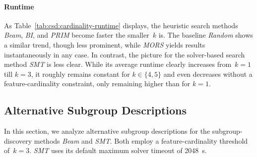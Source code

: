 \documentclass{article}
\theoremstyle{definition}
\begin{document}
\paragraph{Runtime}

As Table~\ref{tab:csd:cardinality-runtime} displays, the heuristic search methods \emph{Beam}, \emph{BI}, and \emph{PRIM} become faster the smaller~$k$ is.
The baseline \emph{Random} shows a similar trend, though less prominent, while \emph{MORS} yields results instantaneously in any case.
In contrast, the picture for the solver-based search method \emph{SMT} is less clear.
While its average runtime clearly increases from~$k=1$ till $k=3$, it roughly remains constant for $k \in \{4, 5\}$ and even decreases without a feature-cardinality constraint, only remaining higher than for $k = 1$.

\subsection{Alternative Subgroup Descriptions}
\label{sec:csd:evaluation:alternatives}

In this section, we analyze alternative subgroup descriptions for the subgroup-discovery methods \emph{Beam} and \emph{SMT}.
Both employ a feature-cardinality threshold of~$k=3$.
\emph{SMT} uses its default maximum solver timeout of 2048~s.
\end{document}
